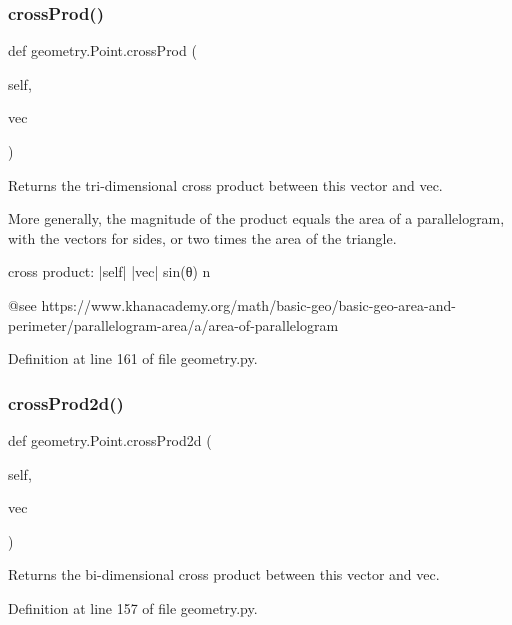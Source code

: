 \subsubsection{\texorpdfstring{cross\+Prod()}{crossProd()}}
{\footnotesize\ttfamily def geometry.\+Point.\+cross\+Prod (\begin{DoxyParamCaption}\item[{}]{self,  }\item[{}]{vec }\end{DoxyParamCaption})}

\begin{DoxyVerb}Returns the tri-dimensional cross product between this vector and vec.

   More generally, the magnitude of the product equals the area of a parallelogram,
   with the vectors for sides, or two times the area of the triangle.

   cross product: |self| |vec| sin(θ) n 

   @see https://www.khanacademy.org/math/basic-geo/basic-geo-area-and-perimeter/parallelogram-area/a/area-of-parallelogram
\end{DoxyVerb}
 

Definition at line 161 of file geometry.\+py.

\mbox{\label{classgeometry_1_1Point_ae6747fdae2c6ec09961298171862ef4b}} 
\subsubsection{\texorpdfstring{cross\+Prod2d()}{crossProd2d()}}
{\footnotesize\ttfamily def geometry.\+Point.\+cross\+Prod2d (\begin{DoxyParamCaption}\item[{}]{self,  }\item[{}]{vec }\end{DoxyParamCaption})}

\begin{DoxyVerb}Returns the bi-dimensional cross product between this vector and vec.\end{DoxyVerb}
 

Definition at line 157 of file geometry.\+py.

\mbox{\label{classgeometry_1_1Point_a8da689422b3b004369e1467f8123e8a7}} 
